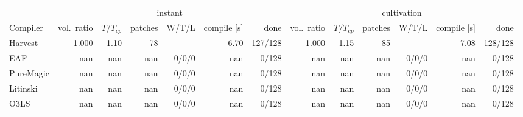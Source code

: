 \begin{tabular}{lrrrrrrrrrrrr}
\toprule
 & \multicolumn{6}{c}{instant} & \multicolumn{6}{c}{cultivation} \\
Compiler & vol.\ ratio & $T/T_{cp}$ & patches & W/T/L & compile [s] & done & vol.\ ratio & $T/T_{cp}$ & patches & W/T/L & compile [s] & done \\
\midrule
Harvest & 1.000 & 1.10 & 78 & -- & 6.70 & 127/128 & 1.000 & 1.15 & 85 & -- & 7.08 & 128/128 \\
EAF & nan & nan & nan & 0/0/0 & nan & 0/128 & nan & nan & nan & 0/0/0 & nan & 0/128 \\
PureMagic & nan & nan & nan & 0/0/0 & nan & 0/128 & nan & nan & nan & 0/0/0 & nan & 0/128 \\
Litinski & nan & nan & nan & 0/0/0 & nan & 0/128 & nan & nan & nan & 0/0/0 & nan & 0/128 \\
O3LS & nan & nan & nan & 0/0/0 & nan & 0/128 & nan & nan & nan & 0/0/0 & nan & 0/128 \\
\bottomrule
\end{tabular}
